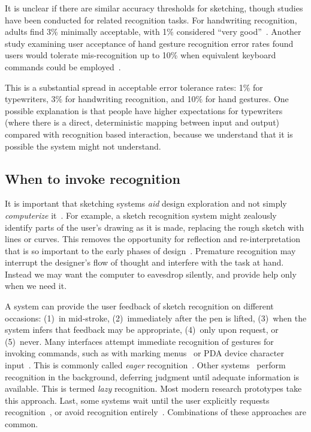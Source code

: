 It is unclear if there are similar accuracy thresholds for sketching,
though studies have been conducted for related recognition tasks. For
handwriting recognition, adults find 3\% minimally acceptable, with
1\% considered ``very
good''~\cite{lalomia-recognition-accuracy}. Another study examining
user acceptance of hand gesture recognition error rates found users
would tolerate mis-recognition up to 10\% when equivalent keyboard
commands could be employed~\cite{karam-gesture-recognition}.

This is a substantial spread in acceptable error tolerance rates: 1\%
for typewriters, 3\% for handwriting recognition, and 10\% for hand
gestures. One possible explanation is that people have higher
expectations for typewriters (where there is a direct, deterministic
mapping between input and output) compared with recognition based
interaction, because we understand that it is possible the system
might not understand.

\subsection{When to invoke recognition}
\label{sec:recognition-when}

It is important that sketching systems \textit{aid} design exploration
and not simply \textit{computerize}
it~\cite{negroponte-soft-arc-mac}. For example, a sketch recognition
system might zealously identify parts of the user's drawing as it is
made, replacing the rough sketch with lines or curves. This removes
the opportunity for reflection and re-interpretation that is so
important to the early phases of
design~\cite{schon-reflective,goldschmidt-dialectics,terry-creative-ui}. Premature
recognition may interrupt the designer's flow of thought and interfere
with the task at hand. Instead we may want the computer to eavesdrop
silently, and provide help only when we need it.

A system can provide the user feedback of sketch recognition on
different occasions: (1)~in mid-stroke, (2)~immediately after the pen
is lifted, (3)~when the system infers that feedback may be
appropriate, (4)~only upon request, or (5)~never. Many interfaces
attempt immediate recognition of gestures for invoking commands, such
as with marking menus~\cite{kurtenbach-marking-menus} or PDA device
character input~\cite{palm}. This is commonly called \textit{eager}
recognition~\cite{blostein-diagrams-review}. Other
systems~\cite{gross-ecn-uist,igarashi-suggestive,alvarado-sketchread-uist}
perform recognition in the background, deferring judgment until
adequate information is available. This is termed \textit{lazy}
recognition. Most modern research prototypes take this approach. Last,
some systems wait until the user explicitly requests
recognition~\cite{landay-silk}, or avoid recognition
entirely~\cite{forbus-nusketch-battlespace}. Combinations of these
approaches are common.

